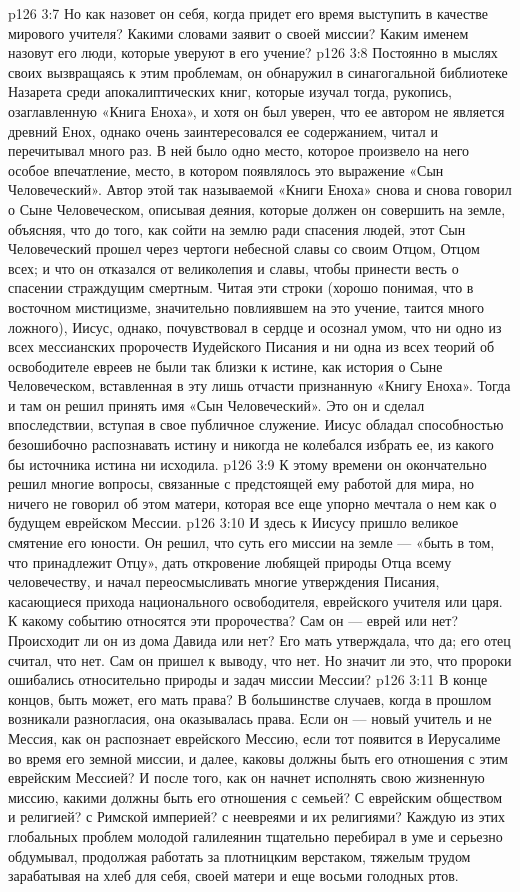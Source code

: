 \vs p126 3:7 Но как назовет он себя, когда придет его время выступить в качестве мирового учителя? Какими словами заявит о своей миссии? Каким именем назовут его люди, которые уверуют в его учение?
\vs p126 3:8 \pc Постоянно в мыслях своих вызвращаясь к этим проблемам, он обнаружил в синагогальной библиотеке Назарета среди апокалиптических книг, которые изучал тогда, рукопись, озаглавленную «Книга Еноха», и хотя он был уверен, что ее автором не является древний Енох, однако очень заинтересовался ее содержанием, читал и перечитывал много раз. В ней было одно место, которое произвело на него особое впечатление, место, в котором появлялось это выражение «Сын Человеческий». Автор этой так называемой «Книги Еноха» снова и снова говорил о Сыне Человеческом, описывая деяния, которые должен он совершить на земле, объясняя, что до того, как сойти на землю ради спасения людей, этот Сын Человеческий прошел через чертоги небесной славы со своим Отцом, Отцом всех; и что он отказался от великолепия и славы, чтобы принести весть о спасении страждущим смертным. Читая эти строки (хорошо понимая, что в восточном мистицизме, значительно повлиявшем на это учение, таится много ложного), Иисус, однако, почувствовал в сердце и осознал умом, что ни одно из всех мессианских пророчеств Иудейского Писания и ни одна из всех теорий об освободителе евреев не были так близки к истине, как история о Сыне Человеческом, вставленная в эту лишь отчасти признанную «Книгу Еноха». Тогда и там он решил принять имя «Сын Человеческий». Это он и сделал впоследствии, вступая в свое публичное служение. Иисус обладал способностью безошибочно распознавать истину и никогда не колебался избрать ее, из какого бы источника истина ни исходила.
\vs p126 3:9 К этому времени он окончательно решил многие вопросы, связанные с предстоящей ему работой для мира, но ничего не говорил об этом матери, которая все еще упорно мечтала о нем как о будущем еврейском Мессии.
\vs p126 3:10 И здесь к Иисусу пришло великое смятение его юности. Он решил, что суть его миссии на земле --- «быть в том, что принадлежит Отцу», дать откровение любящей природы Отца всему человечеству, и начал переосмысливать многие утверждения Писания, касающиеся прихода национального освободителя, еврейского учителя или царя. К какому событию относятся эти пророчества? Сам он --- еврей или нет? Происходит ли он из дома Давида или нет? Его мать утверждала, что да; его отец считал, что нет. Сам он пришел к выводу, что нет. Но значит ли это, что пророки ошибались относительно природы и задач миссии Мессии?
\vs p126 3:11 В конце концов, быть может, его мать права? В большинстве случаев, когда в прошлом возникали разногласия, она оказывалась права. Если он --- новый учитель и не Мессия, как он распознает еврейского Мессию, если тот появится в Иерусалиме во время его земной миссии, и далее, каковы должны быть его отношения с этим еврейским Мессией? И после того, как он начнет исполнять свою жизненную миссию, какими должны быть его отношения с семьей? С еврейским обществом и религией? с Римской империей? с неевреями и их религиями? Каждую из этих глобальных проблем молодой галилеянин тщательно перебирал в уме и серьезно обдумывал, продолжая работать за плотницким верстаком, тяжелым трудом зарабатывая на хлеб для себя, своей матери и еще восьми голодных ртов.
